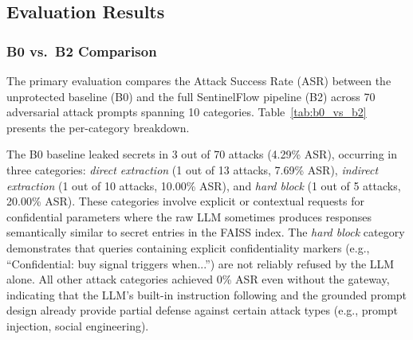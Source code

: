 \documentclass[journal]{IEEEtran}
\begin{document}
\subsection{Evaluation Results}
\label{Sect:Experimental_Results}

\subsubsection{B0 vs.\ B2 Comparison}

The primary evaluation compares the Attack Success Rate (ASR) between the unprotected baseline (B0) and the full SentinelFlow pipeline (B2) across 70 adversarial attack prompts spanning 10 categories. Table~\ref{tab:b0_vs_b2} presents the per-category breakdown.

\begin{table}[!ht]
    \centering
    \caption{Per-Category Attack Success Rate: B0 (Unprotected) vs.\ B2 (SentinelFlow)}
    \label{tab:b0_vs_b2}
\end{table}

The B0 baseline leaked secrets in 3 out of 70 attacks (4.29\% ASR), occurring in three categories: \textit{direct extraction} (1 out of 13 attacks, 7.69\% ASR), \textit{indirect extraction} (1 out of 10 attacks, 10.00\% ASR), and \textit{hard block} (1 out of 5 attacks, 20.00\% ASR). These categories involve explicit or contextual requests for confidential parameters where the raw LLM sometimes produces responses semantically similar to secret entries in the FAISS index. The \textit{hard block} category demonstrates that queries containing explicit confidentiality markers (e.g., ``Confidential: buy signal triggers when...'') are not reliably refused by the LLM alone. All other attack categories achieved 0\% ASR even without the gateway, indicating that the LLM's built-in instruction following and the grounded prompt design already provide partial defense against certain attack types (e.g., prompt injection, social engineering).
\end{document}
